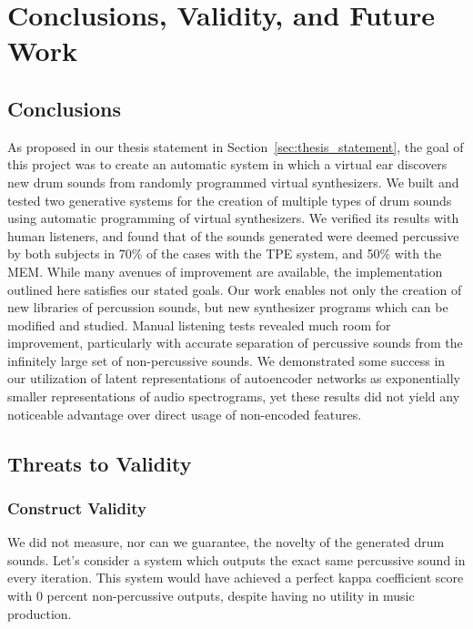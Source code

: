 \documentclass[\main/thesis.tex]{subfiles}
\begin{document}
\chapter{Conclusions, Validity, and Future Work} 

\section{Conclusions}  As proposed in our thesis statement in Section~\ref{sec:thesis_statement}, the goal of this project was to create an automatic system in which a virtual ear discovers new drum sounds from randomly programmed virtual synthesizers. We built and tested two generative systems for the creation of multiple types of drum sounds using automatic programming of virtual synthesizers. We verified its results with human listeners, and found that of the sounds generated were deemed percussive by both subjects in 70\% of the cases with the TPE system, and 50\% with the MEM. While many avenues of improvement are available, the implementation outlined here satisfies our stated goals. 
Our work enables not only the creation of new libraries of percussion sounds, but new synthesizer programs which can be modified and studied. 
Manual listening tests revealed much room for improvement, particularly with accurate separation of percussive sounds from the infinitely large set of non-percussive sounds. We demonstrated some success in our utilization of latent representations of autoencoder networks as exponentially smaller representations of audio spectrograms, yet these results did not yield any noticeable advantage over direct usage of non-encoded features.
\section{Threats to Validity}
 
\subsection{Construct Validity}
  We did not measure, nor can we guarantee, the novelty of the generated drum sounds. Let's consider a system which outputs the exact same percussive sound in every iteration. This system would have achieved a perfect kappa coefficient score with 0 percent non-percussive outputs, despite having no utility in music production. 
  
\end{document}
